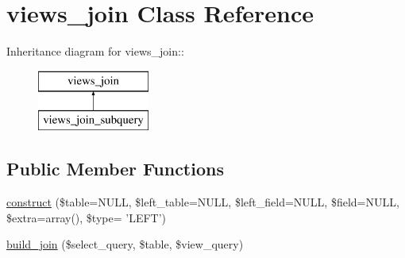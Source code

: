 \hypertarget{classviews__join}{
\section{views\_\-join Class Reference}
\label{classviews__join}
}
Inheritance diagram for views\_\-join::\begin{figure}[H]
\begin{center}
\leavevmode
\includegraphics[height=2cm]{classviews__join}
\end{center}
\end{figure}
\subsection*{Public Member Functions}
\begin{DoxyCompactItemize}
\item 
\hyperlink{classviews__join_ac6c6e70389e0c59e4b068903ef4950b9}{construct} (\$table=NULL, \$left\_\-table=NULL, \$left\_\-field=NULL, \$field=NULL, \$extra=array(), \$type= 'LEFT')
\item 
\hyperlink{classviews__join_a1e7fae5813fcec89a848bc6326f152c5}{build\_\-join} (\$select\_\-query, \$table, \$view\_\-query)
\end{DoxyCompactItemize}
